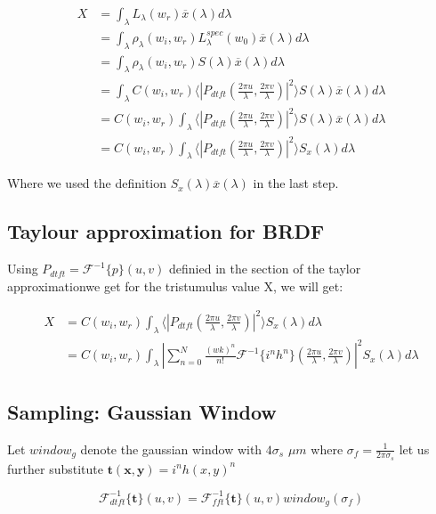 \begin{align*}
X 
& =\int_{\lambda}L_\lambda(w_r)\overline{x}(\lambda)d\lambda \\
& =\int_{\lambda}\rho_\lambda(w_i,w_r)L_\lambda^{spec}(w_0) \overline{x}(\lambda)d\lambda \\
& =\int_{\lambda}\rho_\lambda(w_i,w_r) S(\lambda) \overline{x}(\lambda)d\lambda \\
& =\int_{\lambda} C(w_i,w_r) \langle \left|P_{dtft}(\frac{2\pi u}{\lambda}, \frac{2\pi v}{\lambda})\right|^2\rangle S(\lambda) \overline{x}(\lambda)d\lambda \\
& = C(w_i,w_r) \int_{\lambda} \langle \left|P_{dtft}(\frac{2\pi u}{\lambda}, \frac{2\pi v}{\lambda})\right|^2\rangle S(\lambda) \overline{x}(\lambda)d\lambda \\
& = C(w_i,w_r) \int_{\lambda} \langle \left|P_{dtft}(\frac{2\pi u}{\lambda}, \frac{2\pi v}{\lambda})\right|^2\rangle S_x(\lambda)d\lambda
\end{align*}

Where we used the definition $S_x(\lambda)\overline{x}(\lambda)$ in the last step.

\subsection{Taylour approximation for BRDF}
Using $P_{dtft} = \mathcal{F}^{-1}\{p\}(u,v)$ definied in the section of the taylor approximationwe get for the tristumulus value X, we will get:

\begin{align*}
X 
& = C(w_i,w_r) \int_{\lambda} \langle \left|P_{dtft}(\frac{2\pi u}{\lambda}, \frac{2\pi v}{\lambda})\right|^2\rangle S_x(\lambda)d\lambda \\
& = C(w_i,w_r) \int_{\lambda} \left| \sum_{n=0}^N \frac{(wk)^n}{n!} \mathcal{F}^{-1}\{i^n h^n\}(\frac{2\pi u}{\lambda}, \frac{2\pi v}{\lambda})\right|^2 S_x(\lambda)d\lambda
\end{align*}


\subsection{Sampling: Gaussian Window}


Let $window_g$ denote the gaussian window with $4\sigma_s$ $\mu m$ where $\sigma_f = \frac{1}{2\pi\sigma_s}$
let us further substitute $\mathbf{t(x,y)}=i^n h(x,y)^n$

\begin{equation}
\mathcal{F}_{dtft}^{-1}\{\mathbf{t}\}(u,v) = \mathcal{F}_{fft}^{-1}\{\mathbf{t}\}(u,v)window_g(\sigma_f)
\end{equation} 

